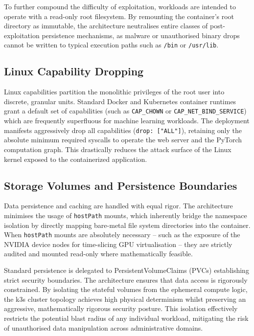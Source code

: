 To further compound the difficulty of exploitation, workloads are intended to operate with a read-only root filesystem. By remounting the container's root directory as immutable, the architecture neutralises entire classes of post-exploitation persistence mechanisms, as malware or unauthorised binary drops cannot be written to typical execution paths such as \texttt{/bin} or \texttt{/usr/lib}.

\subsection{Linux Capability Dropping}
Linux capabilities partition the monolithic privileges of the root user into discrete, granular units. Standard Docker and Kubernetes container runtimes grant a default set of capabilities (such as \texttt{CAP\_CHOWN} or \texttt{CAP\_NET\_BIND\_SERVICE}) which are frequently superfluous for machine learning workloads. The deployment manifests aggressively drop all capabilities (\texttt{drop: ["ALL"]}), retaining only the absolute minimum required syscalls to operate the web server and the PyTorch computation graph. This drastically reduces the attack surface of the Linux kernel exposed to the containerized application.

\subsection{Storage Volumes and Persistence Boundaries}
Data persistence and caching are handled with equal rigor. The architecture minimises the usage of \texttt{hostPath} mounts, which inherently bridge the namespace isolation by directly mapping bare-metal file system directories into the container. When \texttt{hostPath} mounts are absolutely necessary -- such as the exposure of the NVIDIA device nodes for time-slicing GPU virtualisation -- they are strictly audited and mounted read-only where mathematically feasible.

Standard persistence is delegated to PersistentVolumeClaims (PVCs) establishing strict security boundaries. The architecture ensures that data access is rigorously constrained. By isolating the stateful volumes from the ephemeral compute logic, the k3s cluster topology achieves high physical determinism whilst preserving an aggressive, mathematically rigorous security posture. This isolation effectively restricts the potential blast radius of any individual workload, mitigating the risk of unauthorised data manipulation across administrative domains.
